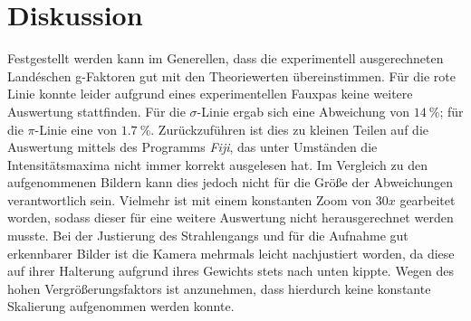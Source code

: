 \section{Diskussion}
Festgestellt werden kann im Generellen, dass die experimentell ausgerechneten Landéschen g-Faktoren gut mit den Theoriewerten übereinstimmen. Für die rote Linie konnte leider aufgrund eines experimentellen Fauxpas keine weitere Auswertung stattfinden.
Für die $\sigma$-Linie ergab sich eine Abweichung von $\SI{14}{\%}$; für die $\pi$-Linie eine von $\SI{1,7}{\%}$. Zurückzuführen ist dies zu kleinen Teilen auf die Auswertung mittels des Programms \textit{Fiji}, das unter Umständen die Intensitätsmaxima nicht immer korrekt ausgelesen hat. Im Vergleich zu den aufgenommenen Bildern kann dies jedoch nicht für die Größe der Abweichungen verantwortlich sein. Vielmehr ist mit einem konstanten Zoom von $30x$ gearbeitet worden, sodass dieser für eine weitere Auswertung nicht herausgerechnet werden musste. Bei der Justierung des Strahlengangs und für die Aufnahme gut erkennbarer Bilder ist die Kamera mehrmals leicht nachjustiert worden, da diese auf ihrer Halterung aufgrund ihres Gewichts stets nach unten kippte. Wegen des hohen Vergrößerungsfaktors ist anzunehmen, dass hierdurch keine konstante Skalierung aufgenommen werden konnte.
